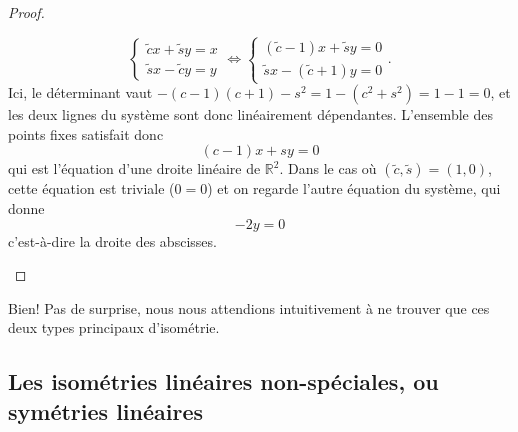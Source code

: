\documentclass{book}
\numberwithin{equation}{section}
\providecommand{\plan}{{\mathbb R^2}}
\begin{document}
\begin{proof}
\begin{itemize}
\begin{equation*}
\begin{cases}
				\tilde cx + \tilde sy = x\\
				\tilde sx - \tilde cy = y
			\end{cases} \iff
			\begin{cases}
				(\tilde c - 1)x + \tilde sy = 0\\
				\tilde sx - (\tilde c + 1)y = 0
			\end{cases}.
		\end{equation*}
		Ici, le déterminant vaut $-(c-1)(c+1) - s^2 = 1 - (c^2 + s^2) = 1-1 = 0$, et les deux lignes du système sont donc linéairement dépendantes. L'ensemble des points fixes satisfait donc
		\begin{equation*}
			(c-1)x + sy = 0
		\end{equation*}
		qui est l'équation d'une droite linéaire de $\plan$. Dans le cas où $(\tilde c, \tilde s) = (1, 0)$, cette équation est triviale ($0 = 0$) et on regarde l'autre équation du système, qui donne
		\begin{equation*}
			-2y = 0
		\end{equation*}
		c'est-à-dire la droite des abscisses.
	\end{itemize}
\end{proof}

Bien! Pas de surprise, nous nous attendions intuitivement à ne trouver que ces deux types principaux d'isométrie.

\subsection{Les isométries linéaires non-spéciales, ou symétries linéaires}
\end{document}
